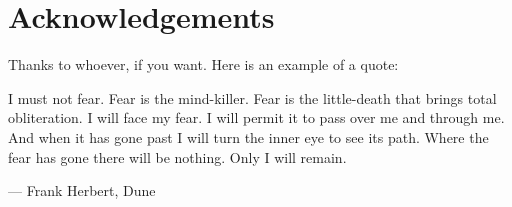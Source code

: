 \chapter*{Acknowledgements}
Thanks to whoever, if you want. Here is an example of a quote:

\epigraph{I must not fear. Fear is the mind-killer. Fear is the little-death that brings total obliteration. I will face my fear. I will permit it to pass over me and through me. And when it has gone past I will turn the inner eye to see its path. Where the fear has gone there will be nothing. Only I will remain.}
         {\normalsize --- \textup{Frank Herbert}, 
          Dune}
